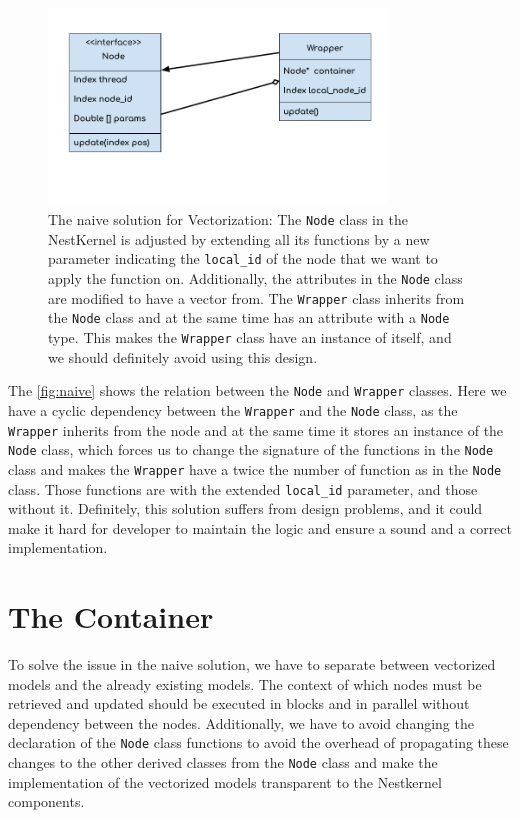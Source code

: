 \begin{figure}[h!]
\centering
\includegraphics[width=0.8\textwidth]{src/pic/wrapper.png}
\caption{The naive solution for Vectorization: The \texttt{Node} class in the NestKernel is adjusted by extending all its functions by a new parameter indicating the \texttt{local\_id} of the node that we want to apply the function on. Additionally, the attributes in the \texttt{Node} class are modified to have a vector from. The \texttt{Wrapper} class inherits from the \texttt{Node} class and at the same time has an attribute with a \texttt{Node} type. This makes the \texttt{Wrapper} class have an instance of itself, and we should definitely avoid using this design.}
\label{fig:naive}
\end{figure}

The \autoref{fig:naive} shows the relation between the \texttt{Node} and \texttt{Wrapper} classes. Here we have a cyclic dependency between the \texttt{Wrapper} and the \texttt{Node} class, as the \texttt{Wrapper} inherits from the node and at the same time it stores an instance of the \texttt{Node} class, which forces us to change the signature of the functions in  the \texttt{Node} class and makes the \texttt{Wrapper} have a twice the number of function as in the \texttt{Node} class. Those functions are with the extended \texttt{local\_id} parameter, and those without it. Definitely, this solution suffers from design problems, and it could make it hard for developer to maintain the logic and ensure a sound  and a correct implementation.

\section{The Container}

To solve the issue in the naive solution, we have to separate between vectorized models and the already existing models. The context of which nodes must be retrieved and updated should be executed in blocks and in parallel without dependency between the nodes. Additionally, we have to avoid changing the declaration of the \texttt{Node} class functions to avoid the overhead of propagating these changes to the other derived classes from the \texttt{Node} class and make the implementation of the vectorized models transparent to the Nestkernel components.



